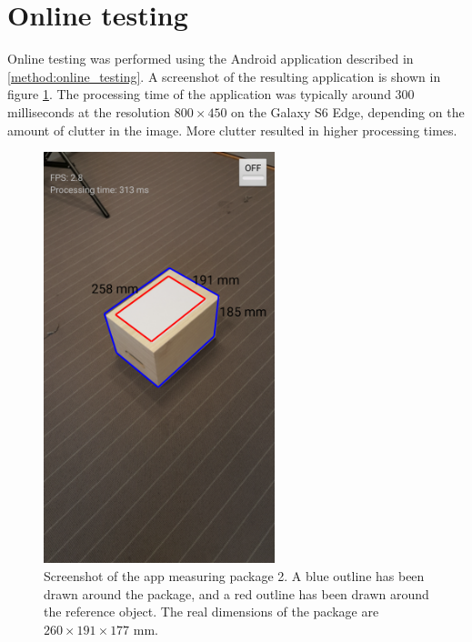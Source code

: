 \section{Online testing} \label{results:online}

Online testing was performed using the Android application described in \ref{method:online_testing}.
A screenshot of the resulting application is shown in figure \ref{fig:screenshot}. %
The processing time of the application was typically around 300 milliseconds at the resolution $800 \times 450$ on the Galaxy S6 Edge, depending on the amount of clutter in the image. 
More clutter resulted in higher processing times.


\begin{figure}[H]
\begin{center}
\includegraphics[width=0.6\textwidth]{figures/screenshot.png}
\end{center}
\caption{Screenshot of the app measuring package 2. A blue outline has been drawn around the package, and a red outline has been drawn around the reference object. The real dimensions of the package are $260 \times 191 \times 177$ mm.}
\label{fig:screenshot}
\end{figure}
